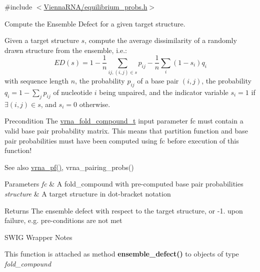 {\ttfamily \#include $<$\mbox{\hyperlink{equilibrium__probs_8h}{Vienna\+R\+N\+A/equilibrium\+\_\+probs.\+h}}$>$}



Compute the Ensemble Defect for a given target structure. 

Given a target structure $s$, compute the average dissimilarity of a randomly drawn structure from the ensemble, i.\+e.\+: \[ ED(s) = 1 - \frac{1}{n} \sum_{ij, (i,j) \in s} p_{ij} - \frac{1}{n} \sum_{i}(1 - s_i)q_i \] with sequence length $n$, the probability $p_{ij}$ of a base pair $(i,j)$, the probability $q_i = 1 - \sum_j p_{ij}$ of nucleotide $i$ being unpaired, and the indicator variable $s_i = 1$ if $\exists (i,j) \in s$, and $s_i = 0$ otherwise.

\begin{DoxyPrecond}{Precondition}
The \mbox{\hyperlink{group__fold__compound_ga1b0cef17fd40466cef5968eaeeff6166}{vrna\+\_\+fold\+\_\+compound\+\_\+t}} input parameter {\ttfamily fc} must contain a valid base pair probability matrix. This means that partition function and base pair probabilities must have been computed using {\ttfamily fc} before execution of this function!
\end{DoxyPrecond}
\begin{DoxySeeAlso}{See also}
\mbox{\hyperlink{group__part__func__global_ga29e256d688ad221b78d37f427e0e99bc}{vrna\+\_\+pf()}}, vrna\+\_\+pairing\+\_\+probs()
\end{DoxySeeAlso}

\begin{DoxyParams}{Parameters}
{\em fc} & A fold\+\_\+compound with pre-\/computed base pair probabilities \\
\hline
{\em structure} & A target structure in dot-\/bracket notation \\
\hline
\end{DoxyParams}
\begin{DoxyReturn}{Returns}
The ensemble defect with respect to the target structure, or -\/1. upon failure, e.\+g. pre-\/conditions are not met
\end{DoxyReturn}
\begin{DoxyRefDesc}{S\+W\+I\+G Wrapper Notes}
\item[\mbox{\hyperlink{wrappers__wrappers000112}{S\+W\+I\+G Wrapper Notes}}]This function is attached as method {\bfseries{ensemble\+\_\+defect()}} to objects of type {\itshape fold\+\_\+compound} \end{DoxyRefDesc}
\mbox{\label{group__part__func__global_ga132664bf29fdc30bb5ea715491d1ab22}} 
